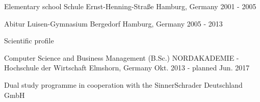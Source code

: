 

\begin{cventries}

  \cventry
    {Elementary school} %
    {Schule Ernst-Henning-Straße} %
    {Hamburg, Germany} %
    {2001 - 2005} %
    {}

  \cventry
    {Abitur} %
    {Luisen-Gymnasium Bergedorf} %
    {Hamburg, Germany} %
    {2005 - 2013} %
    {
      \begin{cvitems} %
        \item {Scientific profile}
      \end{cvitems}
    }

  \cventry
    {Computer Science and Business Management (B.Sc.)} %
    {NORDAKADEMIE - Hochschule der Wirtschaft} %
    {Elmshorn, Germany} %
    {Okt. 2013 - planned Jun. 2017} %
    {
      \begin{cvitems} %
        \item {Dual study programme in cooperation with the SinnerSchrader Deutschland GmbH}
      \end{cvitems}
    }

\end{cventries}
